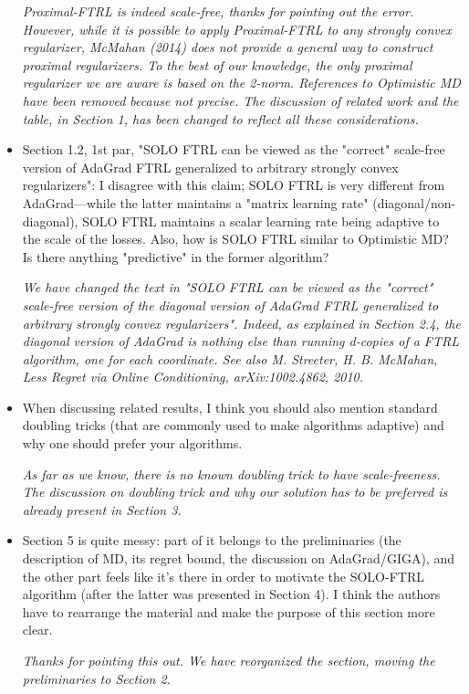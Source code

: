 \documentclass{article}
\begin{document}
\begin{itemize}
\emph{Proximal-FTRL is indeed scale-free, thanks for pointing out the error. However, while it is possible to apply Proximal-FTRL to any strongly convex regularizer, McMahan (2014) does not provide a general way to construct
proximal regularizers. To the best of our knowledge, the only proximal
regularizer we are aware is based on the 2-norm.
References to Optimistic MD have been removed because not precise.
The discussion of related work and the
table, in Section 1, has been changed to reflect all these considerations.}

\item Section 1.2, 1st par, "SOLO FTRL can be viewed as the "correct" scale-free
version of AdaGrad FTRL generalized to arbitrary strongly convex regularizers":
I disagree with this claim; SOLO FTRL is very different from AdaGrad---while
the latter maintains a "matrix learning rate" (diagonal/non-diagonal), SOLO
FTRL maintains a scalar learning rate being adaptive to the scale of the
losses.  Also, how is SOLO FTRL similar to Optimistic MD? Is there anything
"predictive" in the former algorithm?

\emph{We have changed the text in "SOLO FTRL can be viewed as the "correct"
scale-free version of the diagonal version of AdaGrad FTRL generalized to
arbitrary strongly convex regularizers".  Indeed, as explained in Section 2.4,
the diagonal version of AdaGrad is nothing else than running d-copies of a FTRL
algorithm, one for each coordinate. See also M. Streeter, H. B. McMahan, Less
Regret via Online Conditioning, arXiv:1002.4862, 2010.}

\item When discussing related results, I think you should also mention standard
doubling tricks (that are commonly used to make algorithms adaptive) and why
one should prefer your algorithms.

\emph{As far as we know, there is no known doubling trick to have scale-freeness.
The discussion on doubling trick and why our solution has to be preferred is already present in Section 3.}

\item Section 5 is quite messy: part of it belongs to the preliminaries (the
description of MD, its regret bound, the discussion on AdaGrad/GIGA), and the
other part feels like it's there in order to motivate the SOLO-FTRL algorithm
(after the latter was presented in Section 4).  I think the authors have to
rearrange the material and make the purpose of this section more clear.

\emph{Thanks for pointing this out. We have reorganized the section, moving the
  preliminaries to Section 2.}

\end{itemize}
  
\end{document}
